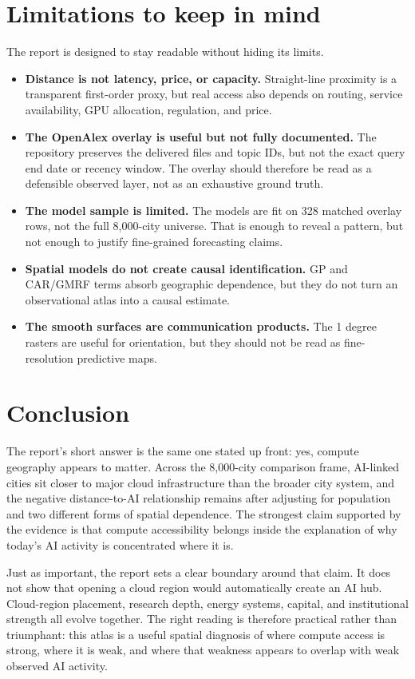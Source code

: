 \documentclass[11pt]{article}
\begin{document}
\section{Limitations to keep in mind}
The report is designed to stay readable without hiding its limits.
\begin{itemize}[leftmargin=*]
  \item \textbf{Distance is not latency, price, or capacity.} Straight-line proximity is a transparent first-order proxy, but real access also depends on routing, service availability, GPU allocation, regulation, and price.
  \item \textbf{The OpenAlex overlay is useful but not fully documented.} The repository preserves the delivered files and topic IDs, but not the exact query end date or recency window. The overlay should therefore be read as a defensible observed layer, not as an exhaustive ground truth.
  \item \textbf{The model sample is limited.} The models are fit on 328 matched overlay rows, not the full 8,000-city universe. That is enough to reveal a pattern, but not enough to justify fine-grained forecasting claims.
  \item \textbf{Spatial models do not create causal identification.} GP and CAR/GMRF terms absorb geographic dependence, but they do not turn an observational atlas into a causal estimate.
  \item \textbf{The smooth surfaces are communication products.} The 1 degree rasters are useful for orientation, but they should not be read as fine-resolution predictive maps.
\end{itemize}

\section{Conclusion}
The report's short answer is the same one stated up front: yes, compute geography appears to matter. Across the 8,000-city comparison frame, AI-linked cities sit closer to major cloud infrastructure than the broader city system, and the negative distance-to-AI relationship remains after adjusting for population and two different forms of spatial dependence. The strongest claim supported by the evidence is that compute accessibility belongs inside the explanation of why today's AI activity is concentrated where it is.

Just as important, the report sets a clear boundary around that claim. It does not show that opening a cloud region would automatically create an AI hub. Cloud-region placement, research depth, energy systems, capital, and institutional strength all evolve together. The right reading is therefore practical rather than triumphant: this atlas is a useful spatial diagnosis of where compute access is strong, where it is weak, and where that weakness appears to overlap with weak observed AI activity.
\end{document}
